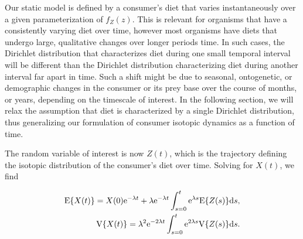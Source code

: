 \documentclass{article}
\begin{document}






Our static model is defined by a consumer's diet that varies instantaneously over a given parameterization of $f_Z(z)$.
This is relevant for organisms that have a consistently varying diet over time, however most organisms have diets that undergo large, qualitative changes over longer periods time.
In such cases, the Dirichlet distribution that characterizes diet during one small temporal interval will be different than the Dirichlet distribution characterizing diet during another interval far apart in time.
Such a shift might be due to seasonal, ontogenetic, or demographic changes in the consumer or its prey base over the course of months, or years, depending on the timescale of interest.
In the following section, we will relax the assumption that diet is characterized by a single Dirichlet distribution, thus generalizing our formulation of consumer isotopic dynamics as a function of time.

The random variable of interest is now $Z(t)$, which is the trajectory defining the isotopic distribution of the consumer's diet over time.
Solving for $X(t)$, we find

\begin{align}
  \label{eqEVarZt}
{\rm E}\{X(t)\} = X(0){\rm e}^{-\lambda t} + \lambda{\rm e}^{-\lambda t} \int_{s=0}^t {\rm e}^{\lambda s} {\rm E}\{Z(s)\}{\rm d}s, \nonumber \\
{\rm V}\{X(t)\} = \lambda^2 {\rm e}^{-2\lambda t} \int_{s=0}^t {\rm e}^{2\lambda s} {\rm V}\{Z(s)\} {\rm d}s.
\end{align}
\end{document}
